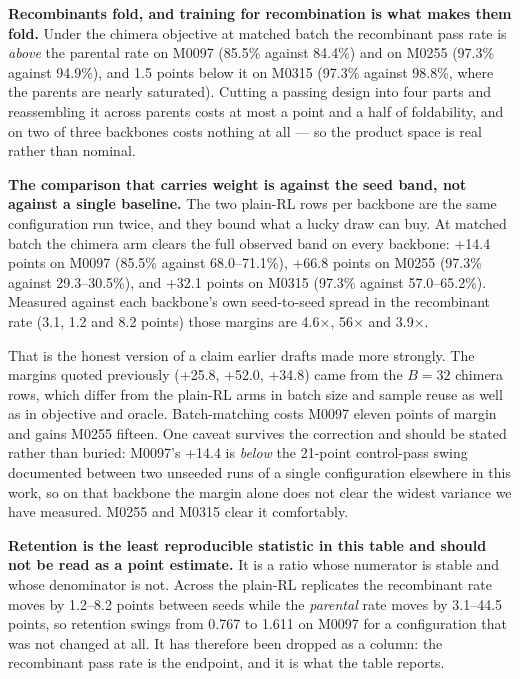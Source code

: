 \textbf{Recombinants fold, and training for recombination is what makes them
fold.} Under the chimera objective at matched batch the recombinant pass rate
is \emph{above} the parental rate on M0097 (85.5\% against 84.4\%) and on
M0255 (97.3\% against 94.9\%), and 1.5 points below it on M0315 (97.3\%
against 98.8\%, where the parents are nearly saturated). Cutting a passing
design into four parts and reassembling it across parents costs at most a
point and a half of foldability, and on two of three backbones costs nothing
at all --- so the product space is real rather than nominal.

\textbf{The comparison that carries weight is against the seed band, not
against a single baseline.} The two plain-RL rows per backbone are the same
configuration run twice, and they bound what a lucky draw can buy. At matched
batch the chimera arm clears the full observed band on every backbone: +14.4
points on M0097 (85.5\% against 68.0--71.1\%), +66.8 points on M0255 (97.3\%
against 29.3--30.5\%), and +32.1 points on M0315 (97.3\% against
57.0--65.2\%). Measured against each backbone's own seed-to-seed spread in the
recombinant rate (3.1, 1.2 and 8.2 points) those margins are 4.6$\times$,
56$\times$ and 3.9$\times$.

That is the honest version of a claim earlier drafts made more strongly. The
margins quoted previously (+25.8, +52.0, +34.8) came from the $B=32$ chimera
rows, which differ from the plain-RL arms in batch size and sample reuse as
well as in objective and oracle. Batch-matching costs M0097 eleven points of
margin and gains M0255 fifteen. One caveat survives the correction and should
be stated rather than buried: M0097's +14.4 is \emph{below} the 21-point
control-pass swing documented between two unseeded runs of a single
configuration elsewhere in this work, so on that backbone the margin alone does
not clear the widest variance we have measured. M0255 and M0315 clear it
comfortably.

\textbf{Retention is the least reproducible statistic in this table and should
not be read as a point estimate.} It is a ratio whose numerator is stable and
whose denominator is not. Across the plain-RL replicates the recombinant rate
moves by 1.2--8.2 points between seeds while the \emph{parental} rate moves by
3.1--44.5 points, so retention swings from 0.767 to 1.611 on M0097 for a
configuration that was not changed at all. It has therefore been dropped as a
column: the recombinant pass rate is the endpoint, and it is what the table
reports.

